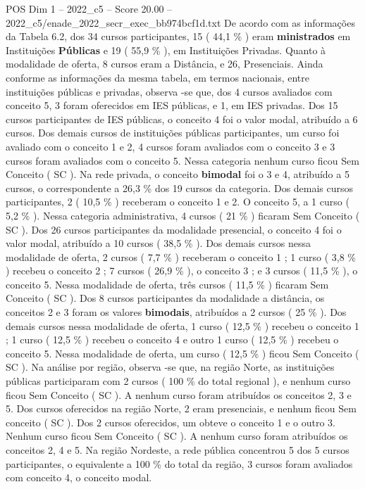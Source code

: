 \begin{textsample}{POS Dim 1 – 2022\_c5 – Score 20.00 – 2022\_c5/enade\_2022\_secr\_exec\_bb974bcf1d.txt}
De acordo com as informações da Tabela 6.2, dos 34 cursos participantes, 15 ( 44,1 \% ) eram \textbf{ministrados} em Instituições \textbf{Públicas} e 19 ( 55,9 \% ), em Instituições Privadas.
Quanto à modalidade de oferta, 8 cursos eram a Distância, e 26, Presenciais.
Ainda conforme as informações da mesma tabela, em termos nacionais, entre instituições públicas e privadas, observa -se que, dos 4 cursos avaliados com conceito 5, 3 foram oferecidos em IES públicas, e 1, em IES privadas.
Dos 15 cursos participantes de IES públicas, o conceito 4 foi o valor modal, atribuído a 6 cursos.
Dos demais cursos de instituições públicas participantes, um curso foi avaliado com o conceito 1 e 2, 4 cursos foram avaliados com o conceito 3 e 3 cursos foram avaliados com o conceito 5.
Nessa categoria nenhum curso ficou Sem Conceito ( SC ).
Na rede privada, o conceito \textbf{bimodal} foi o 3 e 4, atribuído a 5 cursos, o correspondente a 26,3 \% dos 19 cursos da categoria.
Dos demais cursos participantes, 2 ( 10,5 \% ) receberam o conceito 1 e 2.
O conceito 5, a 1 curso ( 5,2 \% ).
Nessa categoria administrativa, 4 cursos ( 21 \% ) ficaram Sem Conceito ( SC ).
Dos 26 cursos participantes da modalidade presencial, o conceito 4 foi o valor modal, atribuído a 10 cursos ( 38,5 \% ).
Dos demais cursos nessa modalidade de oferta, 2 cursos ( 7,7 \% ) receberam o conceito 1 ; 1 curso ( 3,8 \% ) recebeu o conceito 2 ; 7 cursos ( 26,9 \% ), o conceito 3 ; e 3 cursos ( 11,5 \% ), o conceito 5.
Nessa modalidade de oferta, três cursos ( 11,5 \% ) ficaram Sem Conceito ( SC ).
Dos 8 cursos participantes da modalidade a distância, os conceitos 2 e 3 foram os valores \textbf{bimodais}, atribuídos a 2 cursos ( 25 \% ).
Dos demais cursos nessa modalidade de oferta, 1 curso ( 12,5 \% ) recebeu o conceito 1 ; 1 curso ( 12,5 \% ) recebeu o conceito 4 e outro 1 curso ( 12,5 \% ) recebeu o conceito 5.
Nessa modalidade de oferta, um curso ( 12,5 \% ) ficou Sem Conceito ( SC ).
Na análise por região, observa -se que, na região Norte, as instituições públicas participaram com 2 cursos ( 100 \% do total regional ), e nenhum curso ficou Sem Conceito ( SC ).
A nenhum curso foram atribuídos os conceitos 2, 3 e 5.
Dos cursos oferecidos na região Norte, 2 eram presenciais, e nenhum ficou Sem conceito ( SC ).
Dos 2 cursos oferecidos, um obteve o conceito 1 e o outro 3.
Nenhum curso ficou Sem Conceito ( SC ).
A nenhum curso foram atribuídos os conceitos 2, 4 e 5.
Na região Nordeste, a rede pública concentrou 5 dos 5 cursos participantes, o equivalente a 100 \% do total da região, 3 cursos foram avaliados com conceito 4, o conceito modal.

\end{textsample}
